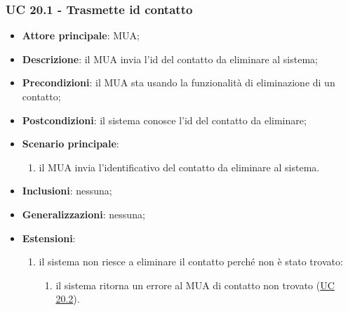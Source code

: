 \subsubsection{UC 20.1 - Trasmette id contatto} \label{sec:UC20.1}
    \begin{itemize}
        \item \textbf{Attore principale}: MUA;
        \item \textbf{Descrizione}:  il MUA invia l'id del contatto da eliminare al sistema;
        \item \textbf{Precondizioni}: il MUA sta usando la funzionalità di eliminazione di un contatto;
        \item \textbf{Postcondizioni}:  il sistema conosce l'id del contatto da eliminare;
        \item \textbf{Scenario principale}:
            \begin{enumerate}
                \item il MUA invia l'identificativo del contatto da eliminare al sistema.
            \end{enumerate}
        \item \textbf{Inclusioni}: nessuna;
        \item \textbf{Generalizzazioni}: nessuna;
        \item \textbf{Estensioni}:
            \begin{enumerate}[label=\alph*.]
                \item il sistema non riesce a eliminare il contatto perché non è stato trovato:
                \begin{enumerate}[label=\arabic*.]
                    \item il sistema ritorna un errore al MUA di contatto non trovato (\hyperref[sec:UC20.2]{UC 20.2}).
                \end{enumerate}
            \end{enumerate}
    \end{itemize}


